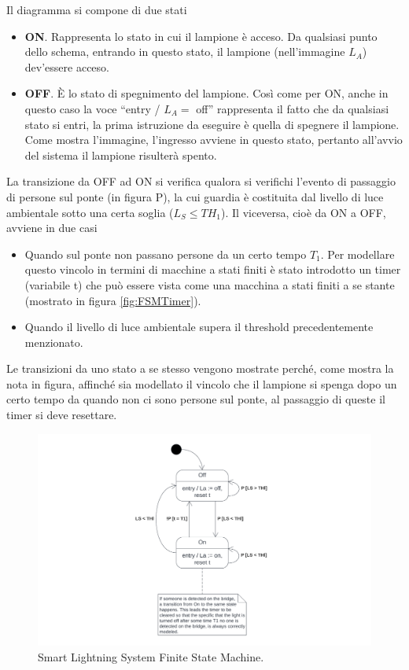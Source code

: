 \documentclass[a4paper,12pt]{report}
\begin{document}
Il diagramma si compone di due stati 
\begin{itemize}
    \item \textbf{ON}. Rappresenta lo stato in cui il lampione è acceso. Da qualsiasi punto dello schema, entrando in questo stato, il lampione (nell'immagine $L_{A}$) dev'essere acceso. 
    \item \textbf{OFF}. È lo stato di spegnimento del lampione. Così come per ON, anche in questo caso la voce ``entry / $L_{A} =$ off'' rappresenta il fatto che da qualsiasi stato si entri, la prima istruzione da eseguire è quella di spegnere il lampione. Come mostra l'immagine, l'ingresso avviene in questo stato, pertanto all'avvio del sistema il lampione risulterà spento.
\end{itemize}
La transizione da OFF ad ON si verifica qualora si verifichi l'evento di passaggio di persone sul ponte (in figura P), la cui guardia è costituita dal livello di luce ambientale sotto una certa soglia ($L_S \leq TH_1$). Il viceversa, cioè da ON a OFF, avviene in due casi
\begin{itemize}
    \item Quando sul ponte non passano persone da un certo tempo $T_1$. Per modellare questo vincolo in termini di macchine a stati finiti è stato introdotto un timer (variabile t) che può essere vista come una macchina a stati finiti a se stante (mostrato in figura \ref{fig:FSMTimer}).
    \item Quando il livello di luce ambientale supera il threshold precedentemente menzionato.
\end{itemize}
Le transizioni da uno stato a se stesso vengono mostrate perché, come mostra la nota in figura, affinché sia modellato il vincolo che il lampione si spenga dopo un certo tempo da quando non ci sono persone sul ponte, al passaggio di queste il timer si deve resettare.
\begin{figure}[H]
\centering
\includegraphics[width=\textwidth]{img/State - SmartLighting.png}
\caption{Smart Lightning System Finite State Machine.}
\label{fig:FSMSmartLightning}
\end{figure}
\end{document}
